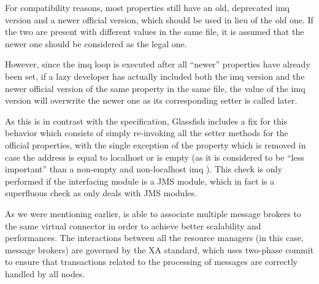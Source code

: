 \note{< >}

\note{< >}

For compatibility reasons, most properties still have an old, deprecated imq version and a newer official version, which should be used in lieu of the old one. If the two are present with different values in the same file, it is assumed that the newer one should be considered as the legal one.

However, since the imq loop is executed after all “newer” properties have already been set, if a lazy developer has actually included both the imq version and the newer official version of the same property in the same file, the value of the imq version will overwrite the newer one as its corresponding setter is called later.

As this is in contrast with the specification, Glassfish includes a fix for this behavior which consists of simply re-invoking all the setter methods for the official properties, with the single exception of the  property which is removed in case the address is equal to localhost or is empty (as it is considered to be “less important” than a non-empty and non-localhost imq ). This check is only performed if the interfacing module is a JMS module, which in fact is a superfluous check as  only deals with JMS modules. 

As we were mentioning earlier,  is able to associate multiple message brokers to the same virtual connector in order to achieve better scalability and performances. The interactions between all the resource managers (in this case, message brokers) are governed by the XA standard, which uses two-phase commit to ensure that transactions related to the processing of messages are correctly handled by all nodes.

